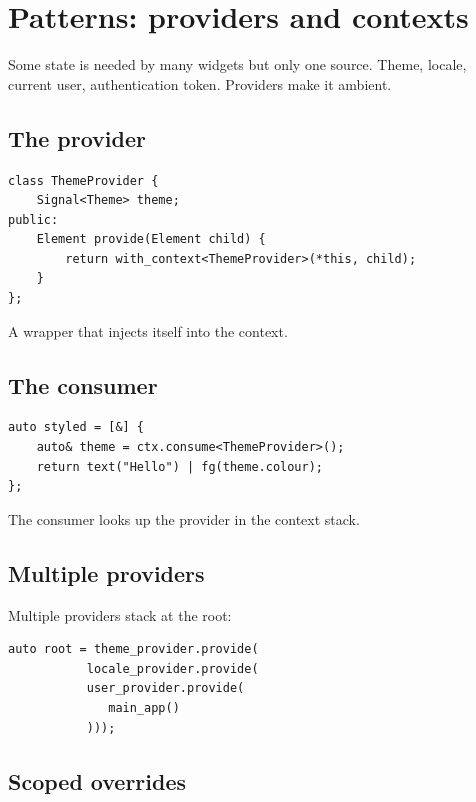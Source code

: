 \chapter{Patterns: providers and contexts}
\label{ch:providers}

\begin{aside}
Some state is needed by many widgets but only one source.
Theme, locale, current user, authentication token. Providers
make it ambient.
\end{aside}

\section{The provider}

\begin{lstlisting}
class ThemeProvider {
    Signal<Theme> theme;
public:
    Element provide(Element child) {
        return with_context<ThemeProvider>(*this, child);
    }
};
\end{lstlisting}

A wrapper that injects itself into the context.

\section{The consumer}

\begin{lstlisting}
auto styled = [&] {
    auto& theme = ctx.consume<ThemeProvider>();
    return text("Hello") | fg(theme.colour);
};
\end{lstlisting}

The consumer looks up the provider in the context stack.

\section{Multiple providers}

Multiple providers stack at the root:

\begin{lstlisting}
auto root = theme_provider.provide(
           locale_provider.provide(
           user_provider.provide(
              main_app()
           )));
\end{lstlisting}

\section{Scoped overrides}

